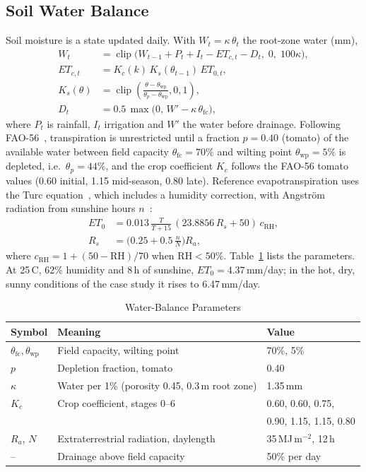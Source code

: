\documentclass[conference]{IEEEtran}
\begin{document}
\subsection{Soil Water Balance}
Soil moisture is a state updated daily. With $W_t = \kappa\,\theta_t$ the root-zone water (mm),
\begin{align}
W_t &= \operatorname{clip}\!\big(W_{t-1} + P_t + I_t - ET_{c,t} - D_t,\; 0,\; 100\kappa\big), \label{eq:wb}\\
ET_{c,t} &= K_c(k)\,K_s(\theta_{t-1})\,ET_{0,t}, \\
K_s(\theta) &= \operatorname{clip}\!\left(\frac{\theta - \theta_{\mathrm{wp}}}{\theta_p - \theta_{\mathrm{wp}}}, 0, 1\right), \\
D_t &= 0.5\,\max\!\big(0,\, W' - \kappa\,\theta_{\mathrm{fc}}\big),
\end{align}
where $P_t$ is rainfall, $I_t$ irrigation and $W'$ the water before drainage. Following
FAO-56~\cite{allen1998crop}, transpiration is unrestricted until a fraction $p = 0.40$ (tomato) of
the available water between field capacity $\theta_{\mathrm{fc}} = 70\%$ and wilting point
$\theta_{\mathrm{wp}} = 5\%$ is depleted, i.e.\ $\theta_p = 44\%$, and the crop coefficient
$K_c$ follows the FAO-56 tomato values (0.60 initial, 1.15 mid-season, 0.80 late). Reference
evapotranspiration uses the Turc equation~\cite{turc1961evaluation}, which includes a humidity
correction, with Angstr\"{o}m radiation from sunshine hours $n$~\cite{allen1998crop}:
\begin{align}
ET_0 &= 0.013\,\frac{T}{T+15}\,(23.8856\,R_s + 50)\,c_{\mathrm{RH}}, \\
R_s &= \Big(0.25 + 0.5\,\frac{n}{N}\Big)R_a,
\end{align}
where $c_{\mathrm{RH}} = 1 + (50 - \mathrm{RH})/70$ when $\mathrm{RH} < 50\%$. Table~\ref{tab:wb} lists the
parameters. At 25\,\textdegree C, 62\% humidity and 8\,h of sunshine, $ET_0 = 4.37$\,mm/day;
in the hot, dry, sunny conditions of the case study it rises to 6.47\,mm/day.

\begin{table}[t]
\centering
\caption{Water-Balance Parameters}
\label{tab:wb}
\footnotesize
\setlength{\tabcolsep}{3pt}
\begin{tabular}{@{}l>{\raggedright\arraybackslash}p{}l@{}}
\toprule
Symbol & Meaning & Value \\
\midrule
$\theta_{\mathrm{fc}}, \theta_{\mathrm{wp}}$ & Field capacity, wilting point & 70\%, 5\% \\
$p$ & Depletion fraction, tomato~\cite{allen1998crop} & 0.40 \\
$\kappa$ & Water per 1\% (porosity 0.45, 0.3\,m root zone) & 1.35\,mm \\
$K_c$ & Crop coefficient, stages 0--6~\cite{allen1998crop} & 0.60, 0.60, 0.75, \\
 & & 0.90, 1.15, 1.15, 0.80 \\
$R_a$, $N$ & Extraterrestrial radiation, daylength & 35\,MJ\,m$^{-2}$, 12\,h \\
-- & Drainage above field capacity & 50\% per day \\
\bottomrule
\end{tabular}
\end{table}
\end{document}
